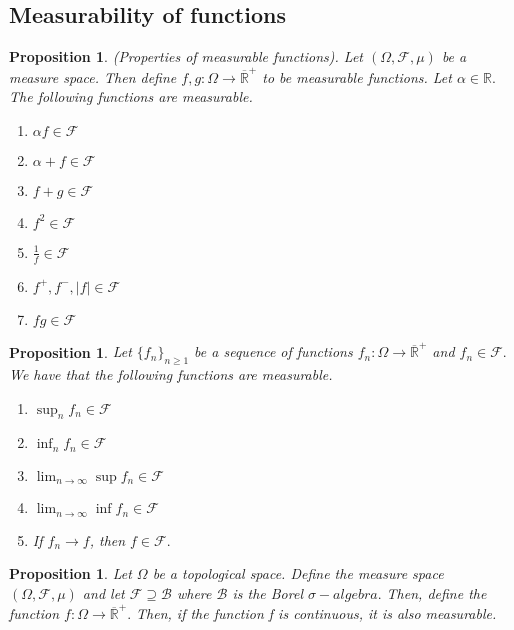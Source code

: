 \documentclass[twoside]{article}
\newtheorem{proposition}[theorem]{Proposition}
\newcommand{\sigmalgebra}{\mathcal{F}}
\newcommand{\borelsigmaalgebra}{\mathcal{B}}
\newcommand{\sa}{\sigma-algebra}
\newcommand{\positiveextendedreal}{\overline{\mathbb{R}}^+}
\begin{document}
\subsection{Measurability of functions}

\begin{proposition}(Properties of measurable functions). Let $(\Omega, \sigmalgebra, \mu)$ be a measure space. Then define $f,g: \Omega \rightarrow \positiveextendedreal$ to be measurable functions. Let $\alpha \in \mathbb{R}.$ The following functions are measurable.
\begin{enumerate}
\item $\alpha f \in \sigmalgebra$
\item $\alpha + f \in \sigmalgebra$
\item $f + g \in \sigmalgebra$
\item $f^2 \in \sigmalgebra$
\item $\frac{1}{f} \in \sigmalgebra$
\item $f^+, f^-, |f| \in \sigmalgebra$
\item $fg \in \sigmalgebra$
\end{enumerate}
\end{proposition}

\begin{proposition}Let $\{f_n\}_{n \geq 1}$ be a sequence of functions $f_n: \Omega \rightarrow \positiveextendedreal$ and $f_n \in \sigmalgebra.$
We have that the following functions are measurable.
\begin{enumerate}
\item $\sup_n f_n \in \sigmalgebra$
\item $\inf_n f_n \in \sigmalgebra$
\item $\lim_{n \rightarrow \infty}\sup f_n \in \sigmalgebra$
\item $\lim_{n \rightarrow \infty}\inf f_n \in \sigmalgebra$
\item If $f_n \rightarrow f$, then $f \in \sigmalgebra.$
\end{enumerate}
\end{proposition}


\begin{proposition}Let $\Omega$ be a topological space. Define the measure space $(\Omega, \sigmalgebra, \mu)$ and let $\sigmalgebra \supseteq \borelsigmaalgebra$ where $\borelsigmaalgebra$ is the Borel $\sa.$ Then, define the function $f: \Omega \rightarrow \positiveextendedreal.$ Then, if the function f is continuous, it is also measurable.
\end{proposition}
\end{document}
